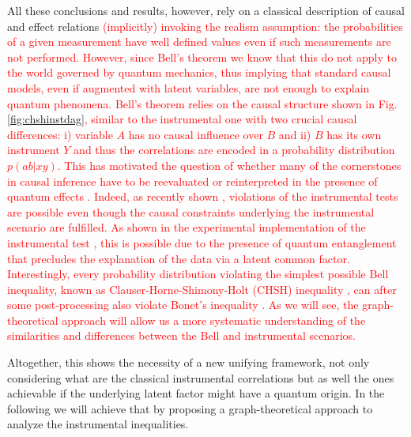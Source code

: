 \documentclass[letterpaper]{article}
\begin{document}
All these conclusions and results, however, rely on a classical description of
causal and effect relations \textcolor{red}{(implicitly) invoking the realism assumption: the probabilities of a given measurement have well defined values even if such measurements are not performed. However, since Bell's theorem \cite{bell1964} we know that this do not apply to the world governed by quantum mechanics, thus implying that standard causal models, even if augmented with latent variables, are not enough to explain quantum phenomena. Bell's theorem relies on the causal structure shown in Fig. \ref{fig:chshinstdag}, similar to the instrumental one with two crucial causal differences: i) variable $A$ has no causal influence over $B$ and ii) $B$ has its own instrument $Y$ and thus the correlations are encoded in a probability distribution $p(ab \vert xy)$. This has motivated the question of whether many of the cornerstones in causal inference have to be
reevaluated or reinterpreted in the presence of quantum effects \cite{ried2015,Costa2016,Wolfe2016}. Indeed, as recently shown \cite{chaves2018}, violations of the instrumental tests are possible even though the causal constraints underlying the instrumental scenario are fulfilled. As shown in the experimental implementation of the instrumental
test \cite{chaves2018}, this is possible due to the presence of quantum entanglement that precludes the explanation of the data via a latent common factor. Interestingly, every probability distribution violating the simplest possible Bell inequality, known as Clauser-Horne-Shimony-Holt (CHSH) inequality \cite{CHSH}, can after some post-processing also violate Bonet's inequality \cite{himbeeck2018}. As we will see, the graph-theoretical approach will allow us a more systematic understanding of the similarities and differences between the Bell and instrumental scenarios.} 

Altogether, this shows the necessity of a new unifying framework, not only
considering what are the classical instrumental correlations but as well the
ones achievable if the underlying latent factor might have a quantum origin. In
the following we will achieve that by proposing a graph-theoretical approach to analyze the instrumental inequalities.
\end{document}
